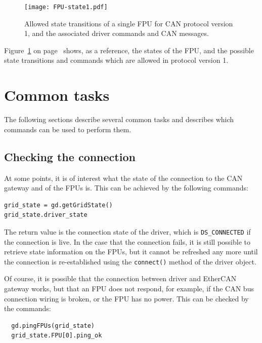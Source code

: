 \documentclass[11pt,a4paper]{report}
\begin{document}
\begin{figure}
  \texttt{[image: FPU-state1.pdf]}
  \caption{Allowed state transitions of a single FPU for CAN protocol
    version 1, and the associated driver commands and CAN messages.}
  \label{fig:states}
\end{figure}


Figure~\ref{fig:states} on page~\pageref{fig:states} shows, as a
reference, the states of the FPU, and the possible state transitions
and commands which are allowed in protocol version 1.




\section{Common tasks}

The following sections describe several common tasks
and describes which commands can be used to perform them.


\subsection{Checking the connection}
At some points, it is of interest what the state of
the connection to the CAN gateway and of the FPUs is.
This can be achieved by the following commands:
\begin{verbatim}
grid_state = gd.getGridState()
grid_state.driver_state  
\end{verbatim}

The return value is the connection state of the driver, which is
\texttt{DS\_CONNECTED} if the connection is live.  In the case that the
connection fails, it is still possible to retrieve state information
on the FPUs, but it cannot be refreshed any more until the connection
is re-established using the \texttt{connect()} method of the driver
object.

 Of course, it is possible that the
connection between driver and EtherCAN gateway works, but that an FPU
does not respond, for example, if the CAN bus connection wiring is
broken, or the FPU has no power. This can be checked by the commands:

\begin{verbatim}
  gd.pingFPUs(grid_state)
  grid_state.FPU[0].ping_ok
\end{verbatim}
\end{document}
